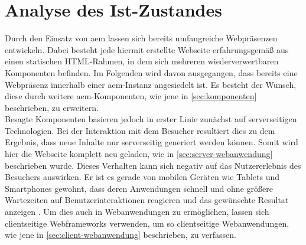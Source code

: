 \chapter{Analyse des Ist-Zustandes}
\label{sec:ist-zustand}

Durch den Einsatz von \ac{aem} lassen sich bereits umfangreiche Webpräsenzen entwickeln. Dabei besteht jede hiermit erstellte Webseite erfahrungsgemäß aus einen statischen HTML-Rahmen, in dem sich mehreren wiederverwertbaren Komponenten befinden. Im Folgenden wird davon ausgegangen, dass bereits eine Webpräsenz innerhalb einer \ac{aem}-Instanz angesiedelt ist. Es besteht der Wunsch, diese durch weitere \ac{aem}-Komponenten, wie jene in \autoref{sec:komponenten} beschrieben, zu erweitern.
\\
Besagte Komponenten basieren jedoch in erster Linie zunächst auf serverseitigen Technologien. Bei der Interaktion mit dem Besucher resultiert dies zu dem Ergebnis, dass neue Inhalte nur serverseitig generiert werden können. Somit wird hier die Webseite komplett neu geladen, wie in \autoref{sec:server-webanwendung} beschrieben wurde. Dieses Verhalten kann sich negativ auf das Nutzererlebnis des Besuchers auswirken. Er ist es gerade von mobilen Geräten wie Tablets und Smartphones gewohnt, dass deren Anwendungen schnell und ohne größere Wartezeiten auf Benutzerinteraktionen reagieren und das gewünschte Resultat anzeigen \cite[S. 78]{Rizvanoglu2013}. Um dies auch in Webanwendungen zu ermöglichen, lassen sich clientseitige Webframeworks verwenden, um so clientseitige Webanwendungen, wie jene in \autoref{sec:client-webanwendung} beschrieben, zu verfassen.\\





%